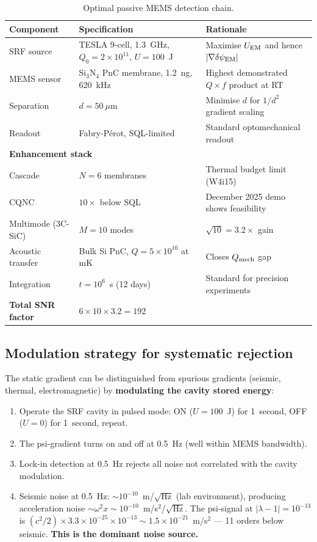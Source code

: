 \documentclass[11pt]{article}
\newcommand{\lam}{\lambda}
\newcommand{\ee}[1]{\times 10^{#1}}
\newcommand{\lbone}{|\lam - 1|}
\newcommand{\dpsiEM}{\delta\psi_{\rm EM}}
\theoremstyle{definition}
\theoremstyle{remark}
\begin{document}
\begin{table}[H]
\centering
\caption{Optimal passive MEMS detection chain.}
\label{tab:optimal_mems}
\renewcommand{\arraystretch}{1.3}
\begin{tabular}{@{}p{3.5cm}p{3.5cm}p{4.5cm}@{}}
\toprule
\textbf{Component} & \textbf{Specification} & \textbf{Rationale} \\
\midrule
SRF source & TESLA 9-cell, 1.3~GHz, $Q_0 = 2\ee{11}$,
  $U = 100$~J & Maximise $U_{\rm EM}$ and hence $|\nabla\dpsiEM|$ \\
MEMS sensor & Si$_3$N$_4$ PnC membrane, 1.2~ng, 620~kHz &
  Highest demonstrated $Q \times f$ product at RT \\
Separation & $d = 50~\mu$m & Minimise $d$ for $1/d^2$ gradient scaling \\
Readout & Fabry-P\'erot, SQL-limited & Standard optomechanical readout \\
\midrule
\multicolumn{3}{l}{\textbf{Enhancement stack}} \\
\midrule
Cascade & $N = 6$ membranes & Thermal budget limit (W4i15) \\
CQNC & $10\times$ below SQL & December 2025 demo shows feasibility \\
Multimode (3C-SiC) & $M = 10$ modes & $\sqrt{10} = 3.2\times$ gain \\
Acoustic transfer & Bulk Si PnC, $Q = 5\ee{10}$ at mK &
  Closes $Q_{\rm mech}$ gap \\
Integration & $t = 10^6$~s (12 days) & Standard for precision experiments \\
\midrule
\textbf{Total SNR factor} & $6 \times 10 \times 3.2 = 192$ & \\
\bottomrule
\end{tabular}
\end{table}


\subsection{Modulation strategy for systematic rejection}

The static gradient can be distinguished from spurious gradients
(seismic, thermal, electromagnetic) by \textbf{modulating the cavity
stored energy}:

\begin{enumerate}[nosep]
\item Operate the SRF cavity in pulsed mode: ON ($U = 100$~J) for
  1~second, OFF ($U = 0$) for 1~second, repeat.
\item The psi-gradient turns on and off at 0.5~Hz (well within MEMS
  bandwidth).
\item Lock-in detection at 0.5~Hz rejects all noise not correlated
  with the cavity modulation.
\item Seismic noise at 0.5~Hz: $\sim 10^{-10}$~m/$\sqrt{\text{Hz}}$
  (lab environment), producing acceleration noise
  $\sim \omega^2 x \sim 10^{-10}$~m/s$^2$/$\sqrt{\text{Hz}}$. The
  psi-signal at $\lbone = 10^{-13}$ is $(c^2/2) \times 3.3\ee{-25}
  \times 10^{-13} \sim 1.5\ee{-21}$~m/s$^2$ --- 11 orders below
  seismic. \textbf{This is the dominant noise source.}
\end{enumerate}
\end{document}
